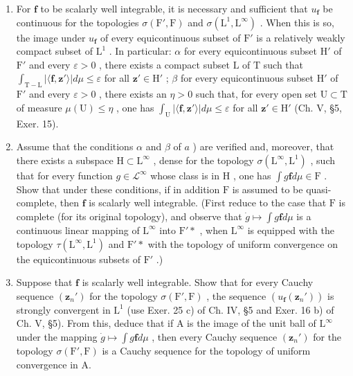 \begin{enumerate}
\def\labelenumi{\alph{enumi})}
\item
  For \(\mathbf{f}\) to be scalarly well integrable, it is necessary and sufficient that \(u_{\mathbf{f}}\) be continuous for the topologies \(\sigma(\mathrm{F}',\mathrm{F})\) and \(\sigma(\mathrm{L}^1,\mathrm{L}^\infty)\) . When this is so, the image under \(u_{\mathbf{f}}\) of every equicontinuous subset of \(\mathrm{F}'\) is a relatively weakly compact subset of \(\mathrm{L}^1\) . In particular: \(\alpha\) for every equicontinuous subset \(\mathrm{H}'\) of \(\mathrm{F}'\) and every \(\varepsilon >0\) , there exists a compact subset \(\mathrm{L}\) of \(\mathrm{T}\) such that \(\int_{\mathrm{T}-\mathrm{L}}|\langle\mathbf{f},\mathbf{z}'\rangle|d\mu\leqslant\varepsilon\) for all \(\mathbf{z}'\in\mathrm{H}'\) ; \(\beta\) for every equicontinuous subset \(\mathrm{H}'\) of \(\mathrm{F}'\) and every \(\varepsilon>0\) , there exists an \(\eta>0\) such that, for every open set \(\mathrm{U}\subset\mathrm{T}\) of measure \(\mu(\mathrm{U})\leqslant\eta\) , one has \(\int_{\mathrm{U}}|\langle\mathbf{f},\mathbf{z}'\rangle|d\mu\leqslant\varepsilon\) for all \(\mathbf{z}'\in\mathrm{H}'\) (Ch. V, §5, Exer. 15).
\item
  Assume that the conditions \(\alpha\) and \(\beta\) of \(a\) ) are verified and, moreover, that there exists a subspace \(\mathrm{H} \subset \mathrm{L}^{\infty}\) , dense for the topology \(\sigma(\mathrm{L}^{\infty}, \mathrm{L}^{1})\) , such that for every function \(g \in \mathcal{L}^{\infty}\) whose class is in \(\mathrm{H}\) , one has \(\int g\mathbf{f}d\mu \in \mathrm{F}\) . Show that under these conditions, if in addition \(\mathrm{F}\) is assumed to be quasi-complete, then \(\mathbf{f}\) is scalarly well integrable. (First reduce to the case that \(\mathrm{F}\) is complete (for its original topology), and observe that \(\dot{g} \mapsto \int g\mathbf{f}d\mu\) is a continuous linear mapping of \(\mathrm{L}^{\infty}\) into \(\mathrm{F}'*\) , when \(\mathrm{L}^{\infty}\) is equipped with the topology \(\tau(\mathrm{L}^{\infty}, \mathrm{L}^{1})\) and \(\mathrm{F}'*\) with the topology of uniform convergence on the equicontinuous subsets of \(\mathrm{F}'\) .)
\item
  Suppose that \(\mathbf{f}\) is scalarly well integrable. Show that for every Cauchy sequence \((\mathbf{z}_n')\) for the topology \(\sigma(\mathrm{F}',\mathrm{F})\) , the sequence \((u_{\mathbf{f}}(\mathbf{z}_n'))\) is strongly convergent in \(\mathrm{L}^1\) (use Exer. 25 c) of Ch. IV, §5 and Exer. 16 b) of Ch. V, §5). From this, deduce that if A is the image of the unit ball of \(\mathrm{L}^{\infty}\) under the mapping \(\dot{g} \mapsto \int g\mathbf{f}d\mu\) , then every Cauchy sequence \((\mathbf{z}_n')\) for the topology \(\sigma(\mathrm{F}',\mathrm{F})\) is a Cauchy sequence for the topology of uniform convergence in A.
\end{enumerate}

